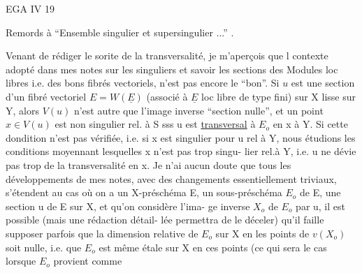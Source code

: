 
EGA IV 19

Remords à ``Ensemble singulier et supersingulier ...'' .

Venant de rédiger le sorite de la transversalité, je m'aperçois que l
contexte adopté dans mes notes sur les  singuliers et 
savoir les sections des Modules loc libres i.e. des bons fibrés vectoriels,
n'est pas encore le ``bon''. Si $u$ est une section d'un fibré vectoriel
$E = W(\underline{E})$ (associé à $\underline{E}$ loc libre de type fini) sur X lisse sur Y, alors $V(u)$
n'est autre que l'image inverse    ``section nulle'', et un point $x\in V(u)$
est non singulier  rel. à S sss u est \uline{transversal} à $E_{o}$ en x  à Y.
Si cette dondition n'est pas vérifiée, i.e. si x est singulier pour u rel à
Y, nous étudions les conditions moyennant lesquelles x n'est pas trop singu-%
lier rel.à Y, i.e. u ne dévie pas trop de la transversalité en x. Je n'ai
aucun doute que tous les développements de mes notes, avec des changements
essentiellement triviaux, s'étendent au cas où on a un X-préschéma E, un
sous-préschéma $E_{o}$ de E, une section  u de E sur X, et qu'on considère l'ima-%
ge inverse $X_{o}$ de $E_{o}$ par u,  il est possible (mais  une rédaction détail-%
lée permettra de le déceler) qu'il faille supposer parfois que la dimension
relative de $E_{o}$ sur X en les points de $v(X_{o})$ soit nulle, i.e. que $E_{o}$ est
même étale sur X en ces points (ce qui sera le cas lorsque $E_{o}$ provient comme
